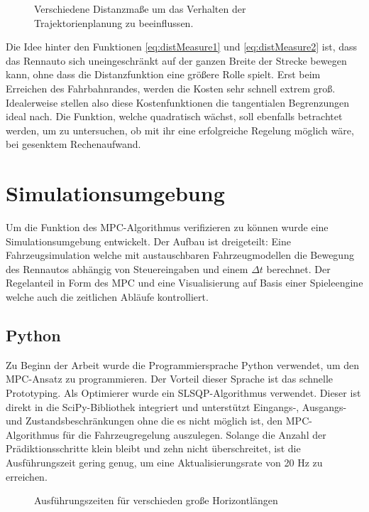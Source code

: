 \documentclass{like}
\begin{document}
\begin{figure}[ht!]
	\centering
	 
	\caption{Verschiedene Distanzmaße um das Verhalten der Trajektorienplanung zu beeinflussen.}
	\label{fig:elasticCost}
\end{figure}

Die Idee hinter den Funktionen \ref{eq:distMeasure1} und \ref{eq:distMeasure2} ist, dass das Rennauto sich uneingeschränkt auf der ganzen Breite der Strecke bewegen kann, ohne dass die Distanzfunktion eine größere Rolle spielt. Erst beim Erreichen des Fahrbahnrandes, werden die Kosten sehr schnell extrem groß. Idealerweise stellen also diese Kostenfunktionen die tangentialen Begrenzungen ideal nach. Die Funktion, welche quadratisch wächst, soll ebenfalls betrachtet werden, um zu untersuchen, ob mit ihr eine erfolgreiche Regelung möglich wäre, bei gesenktem Rechenaufwand. 



\chapter{Simulationsumgebung}
Um die Funktion des \ac{MPC}-Algorithmus verifizieren zu können wurde eine Simulationsumgebung entwickelt. Der Aufbau ist dreigeteilt: Eine Fahrzeugsimulation welche mit austauschbaren Fahrzeugmodellen die Bewegung des Rennautos abhängig von Steuereingaben und einem $\Delta t$ berechnet. Der Regelanteil in Form des \ac{MPC} und eine Visualisierung auf Basis einer Spieleengine welche auch die zeitlichen Abläufe kontrolliert. 



\section{Python}

Zu Beginn der Arbeit wurde die Programmiersprache Python verwendet, um den \ac{MPC}-Ansatz zu programmieren. Der Vorteil dieser Sprache ist das schnelle Prototyping. Als Optimierer wurde ein \ac{SLSQP}-Algorithmus verwendet. Dieser ist direkt in die SciPy-Bibliothek \cite{Scipy} integriert und unterstützt Eingangs-, Ausgangs- und Zustandsbeschränkungen ohne die es nicht möglich ist, den \ac{MPC}-Algorithmus für die Fahrzeugregelung auszulegen. Solange die Anzahl der Prädiktionsschritte klein bleibt und zehn nicht überschreitet, ist die Ausführungszeit gering genug, um eine Aktualisierungsrate von 20 Hz zu erreichen. 

\begin{figure}[ht!]
	\centering
	 
	\caption{Ausführungszeiten für verschieden  große Horizontlängen}
	\label{fig:pythonBench}
\end{figure}
\end{document}
